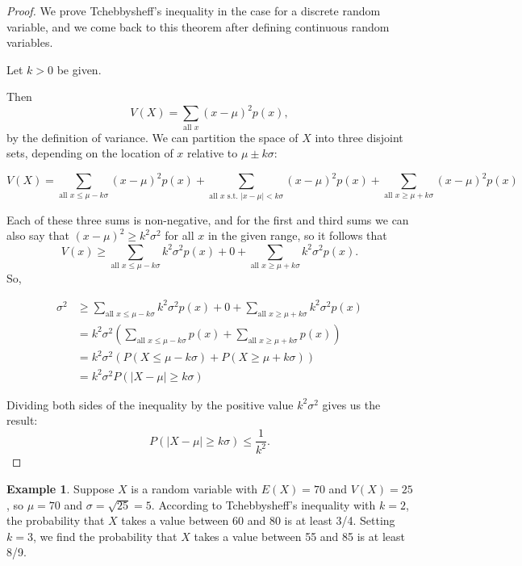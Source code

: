 \documentclass[
]{book}
\theoremstyle{definition}
\theoremstyle{definition}
\newtheorem{example}{Example}[chapter]
\theoremstyle{definition}
\theoremstyle{definition}
\theoremstyle{remark}
\begin{document}
\begin{proof}
We prove Tchebbysheff's inequality in the case for a discrete random variable, and we come back to this theorem after defining continuous random variables.

Let \(k > 0\) be given.

Then \[V(X) = \sum_{\text{all }x} (x - \mu)^2 p(x),\] by the definition of variance. We can partition the space of \(X\) into three disjoint sets, depending on the location of \(x\) relative to \(\mu \pm k\sigma\):

\[V(X) = \sum_{\text{all } x \leq \mu - k\sigma} (x - \mu)^2 p(x) + 
\sum_{\text{all } x \text{ s.t. } |x-\mu|< k\sigma } (x - \mu)^2 p(x) + \sum_{\text{all } x \geq \mu + k\sigma} (x - \mu)^2 p(x)\]

Each of these three sums is non-negative, and for the first and third sums we can also say that \((x-\mu)^2 \geq k^2\sigma^2\) for all \(x\) in the given range, so it follows that \[V(x) \geq \sum_{\text{all } x \leq \mu - k\sigma} k^2\sigma^2 p(x) + 0 + \sum_{\text{all } x \geq \mu + k\sigma} k^2\sigma^2 p(x).\]
So,

\begin{align*}
\sigma^2 &\geq \sum_{\text{all } x \leq \mu - k\sigma} k^2\sigma^2 p(x) + 0 + \sum_{\text{all } x \geq \mu + k\sigma} k^2\sigma^2 p(x)  \\
  &= k^2\sigma^2 \left(\sum_{\text{all } x \leq \mu - k\sigma} p(x) + \sum_{\text{all } x \geq \mu + k\sigma} p(x) \right) \\
  &= k^2\sigma^2\left(P(X\leq \mu-k\sigma)+P(X \geq \mu+k\sigma)\right) \\
  &= k^2\sigma^2P(|X-\mu|\geq k\sigma)
\end{align*}

Dividing both sides of the inequality by the positive value \(k^2\sigma^2\) gives us the result:
\[P(|X-\mu| \geq k\sigma) \leq \frac{1}{k^2}.\]
\end{proof}

\begin{example}
\protect\hypertarget{exm:tchebby}{}\label{exm:tchebby}Suppose \(X\) is a random variable with \(E(X) = 70\) and \(V(X) = 25\), so \(\mu = 70\) and \(\sigma = \sqrt{25} = 5\).
According to Tchebbysheff's inequality with \(k = 2\), the probability that \(X\) takes a value between 60 and 80 is at least 3/4. Setting \(k = 3\), we find the probability that \(X\) takes a value between 55 and 85 is at least 8/9.
\end{example}
\end{document}

